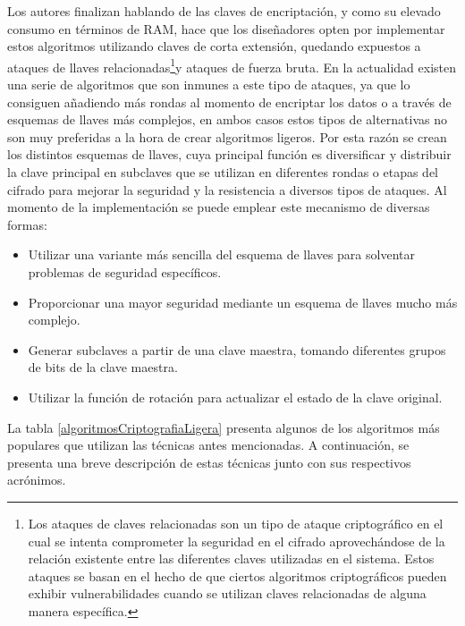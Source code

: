 \documentclass[a4paper,10pt]{article}
\begin{document}
	Los autores finalizan hablando de las claves de encriptación, y como su elevado consumo en términos de RAM, hace que los diseñadores opten por implementar estos algoritmos utilizando claves de corta extensión, quedando expuestos a ataques de llaves relacionadas\footnote{Los ataques de claves relacionadas son un tipo de ataque criptográfico en el cual se intenta comprometer la seguridad en el cifrado aprovechándose de la relación existente entre las diferentes claves utilizadas en el sistema. Estos ataques se basan en el hecho de que ciertos algoritmos criptográficos pueden exhibir vulnerabilidades cuando se utilizan claves relacionadas de alguna manera específica.}y ataques de fuerza bruta. En la actualidad existen una serie de algoritmos que son inmunes a este tipo de ataques, ya que lo consiguen añadiendo más rondas al momento de encriptar los datos o a través de esquemas de llaves más complejos, en ambos casos estos tipos de alternativas no son muy preferidas a la hora de crear algoritmos ligeros. Por esta razón se crean los distintos esquemas de llaves, cuya principal función es diversificar y distribuir la clave principal en subclaves que se utilizan en diferentes rondas o etapas del cifrado para mejorar la seguridad y la resistencia a diversos tipos de ataques. Al momento de la implementación se puede emplear este mecanismo de diversas formas:
	\begin{itemize}
		\item Utilizar una variante más sencilla del esquema de llaves para solventar problemas de seguridad específicos.
		\item Proporcionar una mayor seguridad mediante un esquema de llaves mucho más complejo.
		\item Generar subclaves a partir de una clave maestra, tomando diferentes grupos de bits de la clave maestra.
		\item Utilizar la función de rotación para actualizar el estado de la clave original.
	\end{itemize}
	La tabla \ref{algoritmosCriptografiaLigera} presenta algunos de los algoritmos más populares que utilizan las técnicas antes mencionadas. A continuación, se presenta una breve descripción de estas técnicas junto con sus respectivos acrónimos.
\end{document}
